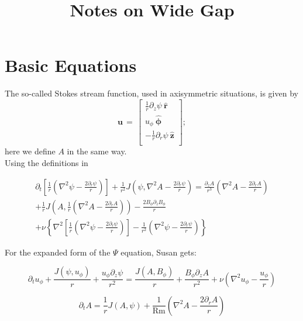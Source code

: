 \documentclass{paper}
\newcommand{\beq}{\begin{equation}}
\newcommand{\eeq}{\end{equation}}
\newcommand{\uphi}{\ensuremath{u_\phi}}
\newcommand{\rhat}{\ensuremath{\mathbf{\hat{r}}}}
\newcommand{\phihat}{\ensuremath{\mathbf{\hat{\phi}}}}
\newcommand{\zhat}{\ensuremath{\mathbf{\hat{z}}}}
\newcommand\reym{\mathrm{Rm}}
\begin{document}
\title{Notes on Wide Gap}

\section{Basic Equations}
\label{sec:equations}
The so-called Stokes stream function, used in axisymmetric situations, is given by 
\begin{equation}
  \label{eq:stokes}
  \mathbf{u} \, = \, \left[\begin{matrix}
\frac{1}{r} \partial_z \psi\ \rhat\\
\uphi \ \phihat\\
-\frac{1}{r} \partial_r \psi\ \zhat\\
\end{matrix}\right];
\end{equation}
here we define $A$ in the same way. \\

Using the definitions in 

\begin{multline}
  \label{eq:psi}
\partial_t \left[ \frac{1}{r} \left(\nabla^2 \psi - \frac{2 \partial_r \psi}{r} \right) \right] + \frac{1}{r^2} J(\psi, \nabla^2 A - \frac{2 \partial_r \psi}{r}) = \frac{\partial_z A}{r^3} \left( \nabla^2 A - \frac{2 \partial_r A}{r}\right) \\
+ \frac{1}{r} J\left(A,\frac{1}{r}\left( \nabla^2 A - \frac{2 \partial_r A}{r}\right)\right) - \frac{2 B_\phi \partial_z B_\phi}{r}\\
+ \nu \left\{ \nabla^2 \left[ \frac{1}{r} \left(\nabla^2 \psi - \frac{2 \partial_r \psi}{r}\right) \right]  -\frac{1}{r^2} \left(\nabla^2 \psi - \frac{2 \partial_r \psi}{r}\right) \right\}
\end{multline}

For the expanded form of the $\Psi$ equation, Susan gets:


\begin{equation}
  \label{eq:uy}
\partial_t \uphi + \frac{J(\psi, \uphi)}{r} + \frac{\uphi \partial_z \psi}{r^2} = \frac{J(A, B_\phi)}{r} + \frac{B_\phi \partial_z A}{r^2} + \nu \left( \nabla^2 \uphi - \frac{\uphi}{r}\right)
\end{equation}


\beq
 \label{eq:A}
\partial_t A = \frac{1}{r} J(A, \psi) + \frac{1}{\reym} \left( \nabla^2 A - \frac{2 \partial_r A}{r} \right)
\eeq
\end{document}
